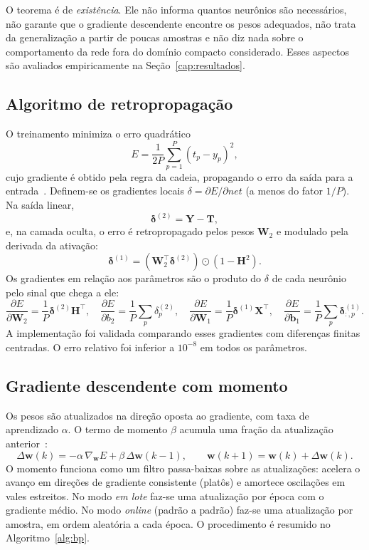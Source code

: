 \documentclass[12pt,oneside,a4paper,english,brazil]{abntex2}
\begin{document}
O teorema é de \emph{existência}. Ele não informa quantos neurônios são
necessários, não garante que o gradiente descendente encontre os pesos
adequados, não trata da generalização a partir de poucas amostras e não diz
nada sobre o comportamento da rede fora do domínio compacto considerado.
Esses aspectos são avaliados empiricamente na Seção~\ref{cap:resultados}.

\subsection{Algoritmo de retropropagação}
O treinamento minimiza o erro quadrático
\begin{equation}
E=\frac{1}{2P}\sum_{p=1}^{P}\left(t_p-y_p\right)^2,
\end{equation}
cujo gradiente é obtido pela regra da cadeia, propagando o erro da saída para
a entrada~\cite{rumelhart1986}. Definem-se os gradientes locais
$\delta=\partial E/\partial\mathit{net}$ (a menos do fator $1/P$). Na saída
linear,
\begin{equation}
\bm{\delta}^{(2)}=\mathbf{Y}-\mathbf{T},
\end{equation}
e, na camada oculta, o erro é retropropagado pelos pesos $\mathbf{W}_2$ e
modulado pela derivada da ativação:
\begin{equation}
\bm{\delta}^{(1)}=\left(\mathbf{W}_2^{\top}\bm{\delta}^{(2)}\right)\odot\left(1-\mathbf{H}^{2}\right).
\end{equation}
Os gradientes em relação aos parâmetros são o produto do $\delta$ de cada
neurônio pelo sinal que chega a ele:
\begin{equation}
\frac{\partial E}{\partial\mathbf{W}_2}=\frac1P\bm{\delta}^{(2)}\mathbf{H}^{\top},\quad
\frac{\partial E}{\partial b_2}=\frac1P\sum_p\delta^{(2)}_p,\quad
\frac{\partial E}{\partial\mathbf{W}_1}=\frac1P\bm{\delta}^{(1)}\mathbf{X}^{\top},\quad
\frac{\partial E}{\partial\mathbf{b}_1}=\frac1P\sum_p\bm{\delta}^{(1)}_{:,p}.
\end{equation}
A implementação foi validada comparando esses gradientes com diferenças
finitas centradas. O erro relativo foi inferior a $10^{-8}$ em todos os
parâmetros.

\subsection{Gradiente descendente com momento}
Os pesos são atualizados na direção oposta ao gradiente, com taxa de
aprendizado $\alpha$. O termo de momento $\beta$ acumula uma fração da
atualização anterior~\cite{rumelhart1986,haykin2009}:
\begin{equation}
\Delta\mathbf{w}(k)=-\alpha\,\nabla_{\mathbf{w}}E+\beta\,\Delta\mathbf{w}(k-1),\qquad
\mathbf{w}(k+1)=\mathbf{w}(k)+\Delta\mathbf{w}(k).
\end{equation}
O momento funciona como um filtro passa-baixas sobre as atualizações: acelera
o avanço em direções de gradiente consistente (platôs) e amortece oscilações
em vales estreitos. No modo \emph{em lote} faz-se uma atualização por época
com o gradiente médio. No modo \emph{online} (padrão a padrão) faz-se uma
atualização por amostra, em ordem aleatória a cada época. O procedimento é
resumido no Algoritmo~\ref{alg:bp}.
\end{document}
